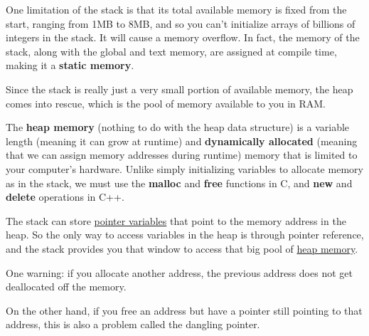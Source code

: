 \documentclass{article}
\newcounter{definition}[section]
\begin{document}
    One limitation of the stack is that its total available memory is fixed from the start, ranging from 1MB to 8MB, and so you can't initialize arrays of billions of integers in the stack. It will cause a memory overflow. In fact, the memory of the stack, along with the global and text memory, are assigned at compile time, making it a \textbf{static memory}. 

    Since the stack is really just a very small portion of available memory, the heap comes into rescue, which is the pool of memory available to you in RAM. 

    \begin{definition}
      \label{def:heap-memory}
      The \textbf{heap memory} (nothing to do with the heap data structure) is a variable length (meaning it can grow at runtime) and \textbf{dynamically allocated} (meaning that we can assign memory addresses during runtime) memory that is limited to your computer's hardware. Unlike simply initializing variables to allocate memory as in the stack, we must use the \textbf{malloc} and \textbf{free} functions in C, and \textbf{new} and \textbf{delete} operations in C++. 
    \end{definition}

    \begin{definition}[malloc]
      \label{def:malloc}
      
    \end{definition}

    \begin{definition}[free]
      \label{def:free}
      
    \end{definition}

    The stack can store \hyperref[def:pointer-variable]{pointer variables} that point to the memory address in the heap. So the only way to access variables in the heap is through pointer reference, and the stack provides you that window to access that big pool of \hyperref[def:heap-memory]{heap memory}. 


    One warning: if you allocate another address, the previous address does not get deallocated off the memory. 

    \begin{definition}
      \label{def:memory-leak}
      
    \end{definition}

    On the other hand, if you free an address but have a pointer still pointing to that address, this is also a problem called the dangling pointer. 
\end{document}
